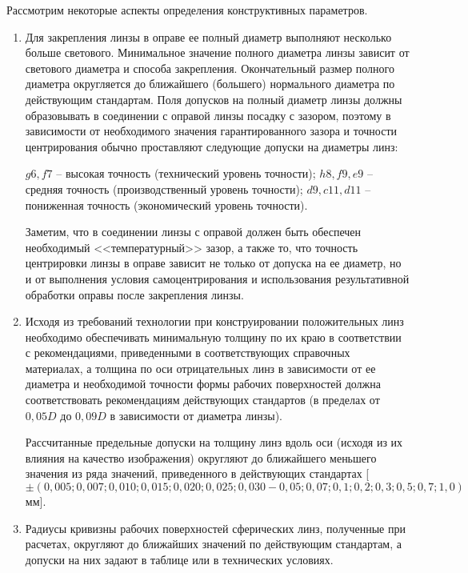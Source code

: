 Рассмотрим некоторые аспекты определения конструктивных параметров.
\begin{enumerate}
	
\item Для закрепления линзы в оправе ее полный диаметр выполняют несколько больше светового. Минимальное значение полного диаметра линзы зависит от светового диаметра и способа закрепления. Окончательный размер полного диаметра округляется до ближайшего (большего) нормального диаметра по действующим стандартам. Поля допусков на полный диаметр линзы должны образовывать в соединении с оправой линзы посадку с зазором, поэтому в зависимости от необходимого значения гарантированного зазора и точности центрирования обычно проставляют следующие допуски на диаметры линз:

$ g6, f7 $ -- высокая точность (технический уровень точности);
$ h8, f9, e9 $ -- средняя точность (производственный уровень точности);
$ d9, c11, d11 $ -- пониженная точность (экономический уровень точности).

Заметим, что в соединении линзы с оправой должен быть обеспечен необходимый <<температурный>> зазор, а также то, что точность центрировки линзы в оправе зависит не только от допуска на ее диаметр, но и от выполнения условия самоцентрирования и использования результативной обработки оправы после закрепления линзы.

\item Исходя из требований технологии при конструировании положительных линз необходимо обеспечивать минимальную толщину по их краю в соответствии с рекомендациями, приведенными в соответствующих справочных материалах, а толщина по оси отрицательных линз в зависимости от ее диаметра и необходимой точности формы рабочих поверхностей должна соответствовать рекомендациям действующих стандартов (в пределах от $ 0,05D $ до $ 0,09D  $ в зависимости от диаметра линзы).

Рассчитанные предельные допуски на толщину линз вдоль оси (исходя из их влияния на качество изображения) округляют до ближайшего меньшего значения из ряда значений, приведенного в действующих стандартах [$ \pm(0,005; 0,007; 0,010; 0,015; 0,020; 0,025; 0,030-0,05; 0,07; 0,1; 0,2; 0,3; 0,5; 0,7; 1,0) $ мм].

\item Радиусы кривизны рабочих поверхностей сферических линз, полученные при расчетах, округляют до ближайших значений по действующим стандартам, а допуски на них задают в таблице или в технических условиях.


\end{enumerate}
